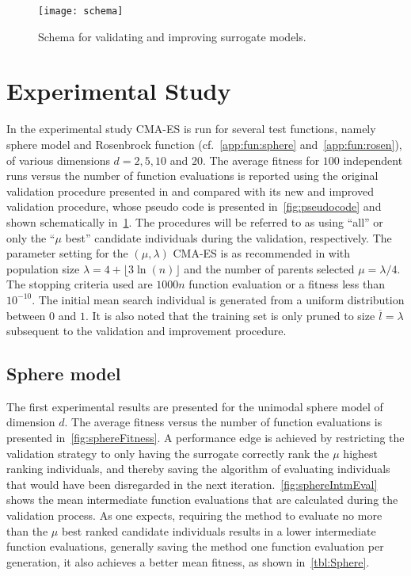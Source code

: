 \begin{figure} \centering 
\texttt{[image: schema]}
\caption{Schema for validating and improving surrogate models.}\label{fig:schema} 
\end{figure}


\section{Experimental Study}\label{sec:sur:expr}
In the experimental study CMA-ES  is run for several test functions, namely sphere model and Rosenbrock function (cf.~\cref{app:fun:sphere} and~\cref{app:fun:rosen}), of various dimensions $d=2,5,10$ and $20$. The average fitness for $100$ independent runs versus the number of function evaluations is reported using the original validation procedure presented in \cite{Ru06:PPSN} and compared with its new and improved validation procedure, whose pseudo code is presented in~\cref{fig:pseudocode} and shown schematically in~\cref{fig:schema}. The procedures will be referred to as using ``all'' or only the ``$\mu$ best'' candidate individuals during the validation, respectively.
The parameter setting for the $(\mu,\lambda)$ CMA-ES is as recommended in \cite{Hansen01} with population size $\lambda = 4+\lfloor 3\ln(n)\rfloor$ and the number of parents selected $\mu=\lambda/4$. The stopping criteria used are $1000n$ function evaluation or a fitness less than $10^{-10}$. The initial mean search individual is generated from a uniform distribution between $0$ and $1$. It is also noted that the training set is only pruned to size $\overline{l} = \lambda$ subsequent to the validation and improvement procedure.

\subsection{Sphere model}\label{sec:sphere}
The first experimental results are presented for the unimodal sphere model of dimension $d$.  
The average fitness versus the number of function evaluations is presented in~\cref{fig:sphereFitness}. A performance edge is achieved by restricting the validation strategy to only having the surrogate correctly rank the $\mu$ highest ranking individuals, and thereby saving the algorithm of evaluating individuals  that would have been disregarded in the next iteration.~\cref{fig:sphereIntmEval} shows the mean intermediate function evaluations that are calculated during the validation process. As one expects, requiring the method to evaluate no more than the $\mu$ best ranked candidate individuals results in a lower intermediate function evaluations, generally saving the method one function evaluation per generation, it also achieves a better mean fitness, as shown in~\cref{tbl:Sphere}.

